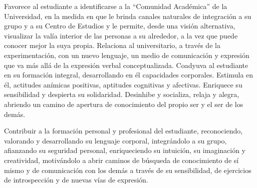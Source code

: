 \begin{syllabus}


\begin{justification}
Favorece al estudiante a identificarse a la ``Comunidad Académica'' de la Universidad, en la medida en que le brinda canales naturales de integración a su grupo y  a su Centro de Estudios y le permite,  desde una visión alternativa, visualizar la valía interior de las personas a su alrededor, a la vez que puede conocer mejor la suya propia.
Relaciona al universitario, a través de la experimentación, con un nuevo lenguaje, un medio de comunicación y expresión que va más allá de la expresión verbal conceptualizada.
Coadyuva al estudiante en su formación integral, desarrollando en él  capacidades corporales. Estimula en él, actitudes anímicas positivas,  aptitudes cognitivas y afectivas. Enriquece su sensibilidad y despierta su solidaridad.
Desinhibe y socializa, relaja y alegra,  abriendo un camino de apertura de conocimiento del propio ser y el ser de los demás.

\end{justification}

\begin{goals}
\item Contribuir a la formación personal y profesional del estudiante, reconociendo, valorando y desarrollando su lenguaje corporal, integrándolo a su grupo, afianzando su seguridad personal, enriqueciendo su intuición, su imaginación y creatividad, motivándolo  a abrir caminos de búsqueda  de conocimiento de sí mismo y de comunicación con los demás a través de su sensibilidad, de ejercicios de introspección y de nuevas vías de expresión.
\end{goals}

\begin{outcomes}
    \item {}
    \item {}
\end{outcomes}

\begin{competences}
    \item {}
    \item {}
    \item {}
\end{competences}


\end{syllabus}
